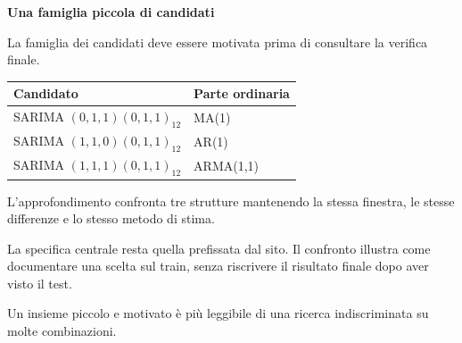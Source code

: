 \documentclass[12pt,aspectratio=1610]{beamer}
\newcommand{\PBody}[1]{\par{\fontsize{11.3}{14.8}\selectfont #1\par}}
\newcommand{\PSmall}[1]{\par{\fontsize{9.8}{13.1}\selectfont #1\par}}
\newcommand{\PInfo}[1]{%
\begin{tcolorbox}[enhanced,arc=1.6mm,boxrule=.55pt,colback=GeoTint,
 colframe=Rule!80!Classical,left=2.3mm,right=2.3mm,top=2mm,bottom=2mm,
 before skip=1mm,after skip=1mm]
\PSmall{#1}\end{tcolorbox}}
\begin{document}
\begin{frame}[plain]\hypertarget{slide52}{}
\begin{lrbox}{\TitleBox}
\begin{minipage}[t]{17.7cm}\raggedright\color{Ink}\fontsize{11.3}{14.8}\selectfont
\color{Navy}\bfseries\fontsize{20.6}{24.5}\selectfont Una famiglia piccola di candidati
\end{minipage}\end{lrbox}

\begin{lrbox}{\RecallBox}
\begin{minipage}[t]{14.3cm}\raggedright\color{Ink}\fontsize{11.3}{14.8}\selectfont
\fontsize{10.3}{13.8}\selectfont La famiglia dei candidati deve essere motivata prima di consultare la verifica finale.
\end{minipage}\end{lrbox}

\begin{lrbox}{\PilotLeftBox}
\begin{minipage}[t]{10.05cm}\raggedright\color{Ink}\fontsize{11.3}{14.8}\selectfont
{\fontsize{10.2}{13.1}\selectfont\renewcommand{\arraystretch}{1.45}\begin{tabular}{@{}p{6.6cm}p{2.5cm}@{}}\toprule
\textbf{Candidato} & \textbf{Parte ordinaria}\\\midrule
SARIMA $(0,1,1)(0,1,1)_{12}$ & MA(1)\\
SARIMA $(1,1,0)(0,1,1)_{12}$ & AR(1)\\
SARIMA $(1,1,1)(0,1,1)_{12}$ & ARMA(1,1)\\
\bottomrule\end{tabular}}

\end{minipage}\end{lrbox}

\begin{lrbox}{\PilotRightBox}
\begin{minipage}[t]{7.55cm}\raggedright\color{Ink}\fontsize{11.3}{14.8}\selectfont
\PBody{L’approfondimento confronta tre strutture mantenendo la stessa finestra, le stesse differenze e lo stesso metodo di stima.}
\vspace{2.5mm}
\PInfo{La specifica centrale resta quella prefissata dal sito. Il confronto illustra come documentare una scelta sul train, senza riscrivere il risultato finale dopo aver visto il test.}
\PSmall{Un insieme piccolo e motivato è più leggibile di una ricerca indiscriminata su molte combinazioni.}


\end{minipage}
\end{lrbox}
\end{frame}
\end{document}
